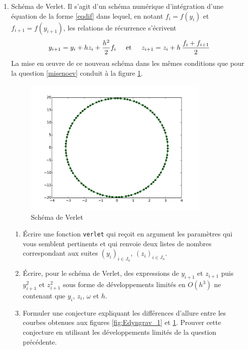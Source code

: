\begin{enumerate}
\item Schéma de Verlet. Il s'agit d'un schéma numérique d'intégration d'une équation de la forme \ref{eqdif} dans lequel, en notant $f_i=f(y_i)$ et $f_{i+1}=f(y_{i+1})$, les relations de récurrence s'écrivent
\begin{displaymath}
  y_{i+1} = y_{i} + hz_i + \frac{h^2}{2} f_i\hspace{0.5cm}\text{et}\hspace{0.5cm} z_{i+1} = z_i + h\,\frac{f_i + f_{i+1}}{2}
\end{displaymath}
La mise en \oe{}uvre de ce nouveau schéma dans les mêmes conditions que pour la question \ref{misenoev} conduit à la figure \ref{fig:Edyngrav_2}.
\begin{figure}[h]
  \centering
  \includegraphics[width=9cm]{./Edyngrav_2_fig.pdf}
  \caption{Schéma de Verlet}
  \label{fig:Edyngrav_2}
\end{figure}
\begin{enumerate}
  \item \'Ecrire une fonction \texttt{verlet} qui reçoit en argument les paramètres qui vous semblent pertinents et qui renvoie deux listes de nombres correspondant aux suites $\left(y_i \right)_{i\in J_n}$, $\left(z_i \right)_{i\in J_n}$.
  \item \'Ecrire, pour le schéma de Verlet, des expressions de $y_{i+1}$ et $z_{i+1}$ puis $y_{i+1}^2$ et $z_{i+1}^2$ sous forme de développements limités en $O(h^3)$ ne contenant que $y_i$, $z_i$, $\omega$ et $h$.
  \item Formuler une conjecture expliquant les différences d'allure entre les courbes obtenues aux figures \ref{fig:Edyngrav_1} et \ref{fig:Edyngrav_2}. Prouver cette conjecture en utilisant les développements limités de la question précédente. 
\end{enumerate}
\end{enumerate}

